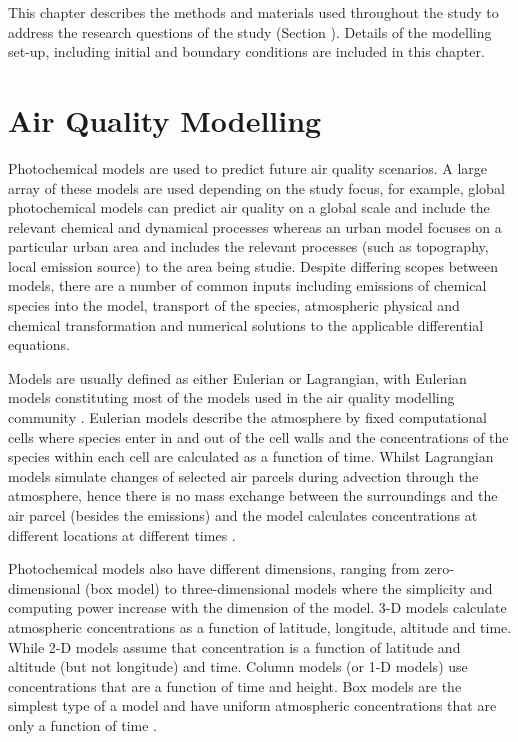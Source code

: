 This chapter describes the methods and materials used throughout the study to address the research questions of the study (Section ).
Details of the modelling set-up, including initial and boundary conditions are included in this chapter.

\section{Air Quality Modelling} \label{s:modelling}

Photochemical models are used to predict future air quality scenarios.
A large array of these models are used depending on the study focus, for example, global photochemical models can predict air quality on a global scale and include the relevant chemical and dynamical processes whereas an urban model focuses on a particular urban area and includes the relevant processes (such as topography, local emission source) to the area being studie.
Despite differing scopes between models, there are a number of common inputs including emissions of chemical species into the model, transport of the species, atmospheric physical and chemical transformation and numerical solutions to the applicable differential equations.

Models are usually defined as either Eulerian or Lagrangian, with Eulerian models constituting most of the models used in the air quality modelling community \citep{Russell:2000}.
Eulerian models describe the atmosphere by fixed computational cells where species enter in and out of the cell walls and the concentrations of the species within each cell are calculated as a function of time. 
Whilst Lagrangian models simulate changes of selected air parcels during advection through the atmosphere, hence there is no mass exchange between the surroundings and the air parcel (besides the emissions) and the model calculates concentrations at different locations at different times \citep{Seinfeld:2006}. 

Photochemical models also have different dimensions, ranging from zero-dimensional (box model) to three-dimensional models where the simplicity and computing power increase with the dimension of the model.
3-D models calculate atmospheric concentrations as a function of latitude, longitude, altitude and time. 
While 2-D models assume that concentration is a function of latitude and altitude (but not longitude) and time.
Column models (or 1-D models) use concentrations that are a function of time and height.
Box models are the simplest type of a model and have uniform atmospheric concentrations that are only a function of time \citep{Seinfeld:2006}.

